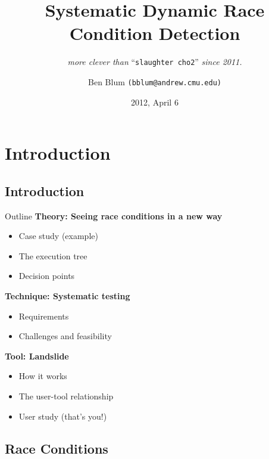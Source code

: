 \documentclass[xcolor=dvipsnames]{beamer}
\title[Landslide]{{\bf Systematic Dynamic Race Condition Detection}}
\subtitle[]{ {\em more clever than } ``\texttt{slaughter cho2}'' {\em since 2011.}}
\author[Ben Blum]{Ben Blum \texttt{(bblum@andrew.cmu.edu)}}
\institute[CMU 15-410]{Carnegie Mellon University - 15-410}
\date[]{2012, April 6}
\begin{document}
\normalem
\begin{frame}
	\titlepage
\end{frame}


\newcommand\linegap{\vspace{0.2in}}
\newcommand\breakslide[1]{\begin{frame}{} \begin{center} #1 \end{center} \end{frame}}

\section{Introduction}
\subsection{Introduction}

\begin{frame}{Outline}
	\textbf{Theory: Seeing race conditions in a new way}
	\begin{itemize}
		\item Case study (example)
		\item The execution tree
		\item Decision points
	\end{itemize}
	{\bf Technique: Systematic testing}
	\begin{itemize}
		\item Requirements
		\item Challenges and feasibility
	\end{itemize}
	{\bf Tool: Landslide}
	\begin{itemize}
		\item How it works
		\item The user-tool relationship
		\item User study (that's you!)
	\end{itemize}
\end{frame}

\subsection{Race Conditions}
\end{document}
